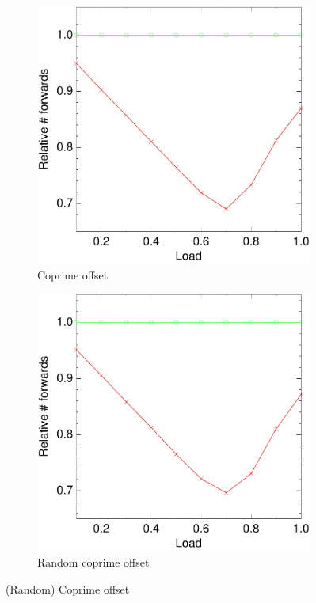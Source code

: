 \documentclass[10pt,a4paper]{article}
\begin{document}
\begin{figure}[h!tb]
        \begin{subfigure}[b]{0.5\textwidth}
                \centering
                \includegraphics[width=\textwidth]{data/primeright.pdf}
                \caption{Coprime offset}
        \end{subfigure}
        \begin{subfigure}[b]{0.5\textwidth}
                \centering
                \includegraphics[width=\textwidth]{data/randprimeright.pdf}
                \caption{Random coprime offset}
                \label{figsimrcp}
        \end{subfigure}
\caption{(Random) Coprime offset}
\label{figprimes}
\end{figure}
\end{document}
